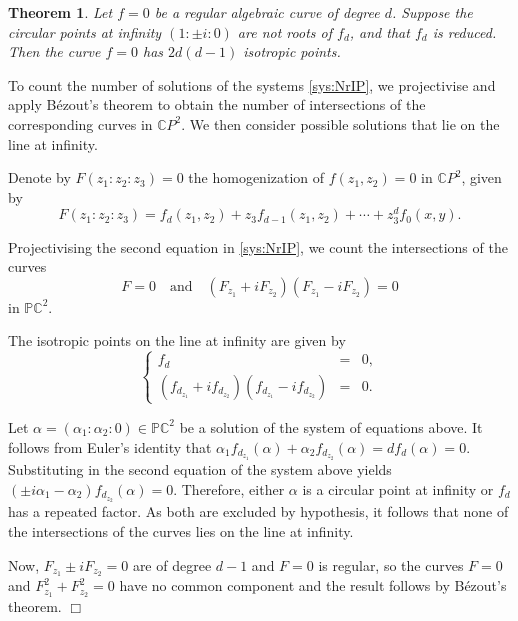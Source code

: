 \documentclass[12pt,a4paper]{article}
\newtheorem{theo}[prop]{Theorem}
\newenvironment{proof}
{\begin{trivlist} \item[\hskip \labelsep {\bf Proof}\hspace*{3 mm}]}
	{\hfill$\Box$\end{trivlist}}
\begin{document}
\begin{theo} Let $f=0$ be a regular algebraic curve of degree $d$.
Suppose the circular points at infinity $(1: \pm i:0)$ are not roots of $f_d$, and that $f_d$ is reduced. Then the curve $f=0$ has $2d(d-1)$ isotropic points. 
\end{theo}


\begin{proof}
To count the number of solutions of the systems \eqref{sys:NrIP}, we projectivise and apply Bézout’s theorem to obtain the number of intersections of the corresponding curves in 
$\mathbb CP^2$. We then consider possible solutions that lie on the line at infinity.

Denote by 
$F(z_1:z_2:z_3)=0$ the homogenization of $f(z_1,z_2)=0$ in $\mathbb{C}P^2$, given by
\begin{equation}\label{eq:HomogF}
F(z_1:z_2:z_3) = f_d(z_1,z_2) + z_3 f_{d-1}(z_1,z_2) + \cdots + z_3^df_{0}(x,y).    
\end{equation}

Projectivising the second equation in \eqref{sys:NrIP}, we count the intersections of the curves  
$$
F=0 \quad \mbox{and}\quad (F_{z_{1}} + iF_{ z_{2}})(F_{z_{1}} -iF_{ z_{2}})=0
$$ 
in $\mathbb{PC}^{2}$. 

The isotropic points on the line at infinity are given by
$$\left\{
\begin{array}{rcl}
    f_{d} &=& 0,\\
    (f_{{d}_{z_{1}}} +if_{{d}_{z_{2}}})(f_{{d}_{z_{1}}} - if_{{d}_{z_{2}}})&=& 0.
\end{array}
\right.
$$

Let $\alpha = (\alpha_1:\alpha_{2}:0) \in \mathbb{PC}^{2}$ be a solution of the system of equations above. It follows from Euler's identity that 
$\alpha_1f_{{d}_{z_{1}}}(\alpha) + \alpha_{2}f_{{d}_{z_{2}}}(\alpha)=df_{d}(\alpha) = 0$. Substituting in the second equation of the system above yields $(\pm i\alpha_1 -\alpha_2)f_{{d}_{z_{2}}}(\alpha)=0$. Therefore, either $\alpha$ is a circular point at infinity or $f_d$ has a repeated factor. As both are excluded by hypothesis, it follows that none of the intersections of the curves lies on the line at infinity.
 
Now, $F_{z_{1}} \pm  iF_{ z_{2}}=0$ are of degree $d-1$ and $F=0$ is regular, so the curves $F=0$ and  $F_{z_{1}}^2 + F_{ z_{2}}^2=0$ have no common component and the result follows by Bézout's theorem.
\end{proof}
\end{document}

